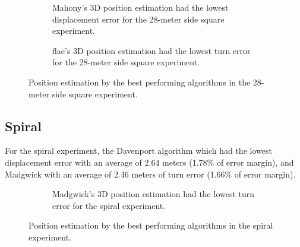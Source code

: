 \begin{figure}[H]
    \centering
    \begin{subfigure}{0.49\textwidth}
        \centering
        \resizebox{1\linewidth}{!}{}
        \caption{Mahony's 3D position estimation had the lowest displacement error for the 28-meter side square experiment.}
        \label{fig:square282D}
    \end{subfigure}
    \begin{subfigure}{0.49\textwidth}
        \centering
        \resizebox{1\linewidth}{!}{}
        \caption{\acrshort{flae}'s 3D position estimation had the lowest turn error for the 28-meter side square experiment.}
        \label{fig:square283D}
    \end{subfigure}
    \caption{Position estimation by the best performing algorithms in the 28-meter side square experiment.}
    \label{fig:square28}
\end{figure}

\subsection{Spiral}

For the spiral experiment, the Davenport algorithm which had the lowest displacement error with an average of 2.64 meters (1.78\% of error margin), and Madgwick with an average of 2.46 meters of turn error (1.66\% of error margin).

\vspace{-0.5cm}

\vspace{-1.5cm}

\begin{figure}[H]
    \centering
    \begin{subfigure}{0.49\textwidth}
        \centering
        \resizebox{1\linewidth}{!}{}
        \label{fig:spiral2D}
    \end{subfigure}
    \begin{subfigure}{0.49\textwidth}
        \centering
        \resizebox{1\linewidth}{!}{}
        \caption{Madgwick's 3D position estimation had the lowest turn error for the spiral experiment.}
        \label{fig:spiral3D}
    \end{subfigure}
    \caption{Position estimation by the best performing algorithms in the spiral experiment.}
    \label{fig:spiral}
\end{figure}

